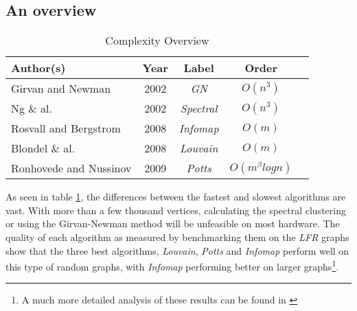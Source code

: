 \subsection{An overview}

\begin{table}
	\small
\begin{tabular}{l*{4}{c}}
	Author(s) & Year & Label & Order \\
	\hline
	\noalign{\smallskip} 
	Girvan and Newman & 2002 & \emph{GN} & $O(n^3)$ \\
	Ng \& al. & 2002 & \emph{Spectral} & $O(n^3)$ \\
	Rosvall and Bergstrom & 2008 & \emph{Infomap} & $O(m)$ \\
	Blondel \& al. & 2008 & \emph{Louvain} & $O(m)$ \\
	Ronhovede and Nussinov & 2009 & \emph{Potts} & $O(m^\beta log n)$ \\
\end{tabular}
\caption{Complexity Overview}
\label{table:complexity}
\end{table}

As seen in table \ref{table:complexity}, the differences between the 
fastest and slowest algorithms are vast. With more than a few thousand 
vertices, calculating the spectral clustering or using the Girvan-Newman 
method will be unfeasible on most hardware.  The quality of each 
algorithm as measured by benchmarking them on the \emph{LFR} graphs show 
that the three best algorithms, \emph{Louvain}, \emph{Potts} and 
\emph{Infomap} perform well on this type of random graphs, with 
\emph{Infomap} performing better on larger graphs\footnote{A much more 
detailed analysis of these results can be found in 
\cite{lancichinetti2009}}. 

